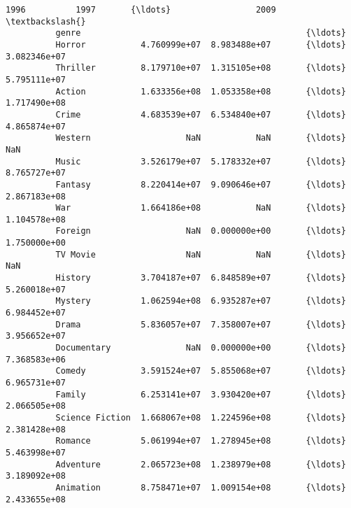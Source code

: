 \documentclass[11pt]{article}
\begin{document}
\begin{Verbatim}[commandchars=\\\{\}]
                                   1996          1997       {\ldots}                 2009  \textbackslash{}
          genre                                             {\ldots}                        
          Horror           4.760999e+07  8.983488e+07       {\ldots}         3.082346e+07   
          Thriller         8.179710e+07  1.315105e+08       {\ldots}         5.795111e+07   
          Action           1.633356e+08  1.053358e+08       {\ldots}         1.717490e+08   
          Crime            4.683539e+07  6.534840e+07       {\ldots}         4.865874e+07   
          Western                   NaN           NaN       {\ldots}                  NaN   
          Music            3.526179e+07  5.178332e+07       {\ldots}         8.765727e+07   
          Fantasy          8.220414e+07  9.090646e+07       {\ldots}         2.867183e+08   
          War              1.664186e+08           NaN       {\ldots}         1.104578e+08   
          Foreign                   NaN  0.000000e+00       {\ldots}         1.750000e+00   
          TV Movie                  NaN           NaN       {\ldots}                  NaN   
          History          3.704187e+07  6.848589e+07       {\ldots}         5.260018e+07   
          Mystery          1.062594e+08  6.935287e+07       {\ldots}         6.984452e+07   
          Drama            5.836057e+07  7.358007e+07       {\ldots}         3.956652e+07   
          Documentary               NaN  0.000000e+00       {\ldots}         7.368583e+06   
          Comedy           3.591524e+07  5.855068e+07       {\ldots}         6.965731e+07   
          Family           6.253141e+07  3.930420e+07       {\ldots}         2.066505e+08   
          Science Fiction  1.668067e+08  1.224596e+08       {\ldots}         2.381428e+08   
          Romance          5.061994e+07  1.278945e+08       {\ldots}         5.463998e+07   
          Adventure        2.065723e+08  1.238979e+08       {\ldots}         3.189092e+08   
          Animation        8.758471e+07  1.009154e+08       {\ldots}         2.433655e+08   
          

\end{Verbatim}
\end{document}
